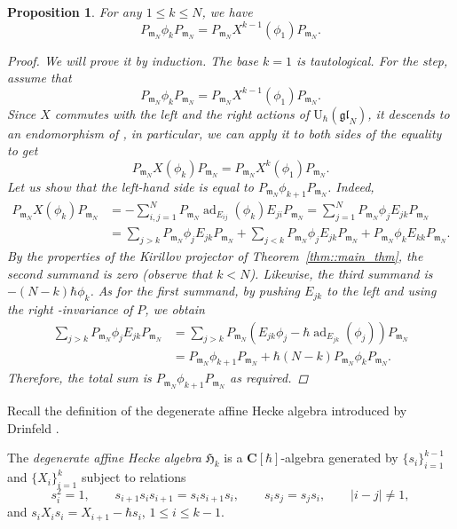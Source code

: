 \documentclass[10pt,a4paper]{article}
\numberwithin{equation}{section}
\newtheorem{Proposition}[Theorem]{Proposition}
{ \theoremstyle{definition}
	\newtheorem{Definition}[Theorem]{Definition}
	\newtheorem{Note}[Theorem]{Note}
	\newtheorem{Example}[Theorem]{Example}
	\newtheorem{Remark}[Theorem]{Remark} }
\newcommand{\C}{\mathbf{C}}
\newcommand{\U}{\mathrm{U}_{\hbar}}
\newcommand{\n}{\mathfrak{n}}
\newcommand{\m}{\mathfrak{m}}
\DeclareMathOperator{\ad}{ad}
\newcommand{\res}{\mathrm{res}}
\newcommand{\gl}{\mathfrak{gl}}
\begin{document}
	\begin{Proposition}
		\label{prop:canonical_homomorphism}
		For any $1\leq k \leq N$, we have
		\[
		P_{\m_N} \phi_k P_{\m_N} = P_{\m_N}X^{k-1} (\phi_1) P_{\m_N}.
		\]
		\begin{proof}
			We will prove it by induction. The base $k=1$ is tautological. For the step, assume that
			\[
			P_{\m_N} \phi_k P_{\m_N}= P_{\m_N} X^{k-1} (\phi_1) P_{\m_N}.
			\]
			Since $X$ commutes with the left and the right actions of $\U(\gl_N)$, it descends to an endomorphism of \smash{$\res^{\psi}_{\gl_N}(V \otimes \U(\gl_N))$}, in particular, we can apply it to both sides of the equality to get
			\[
			P_{\m_N} X(\phi_k) P_{\m_N} = P_{\m_N}X^k(\phi_1) P_{\m_N}.
			\]
			Let us show that the left-hand side is equal to $P_{\m_N}\phi_{k+1} P_{\m_N}$. Indeed,
			\begin{align*}
				P_{\m_N}X(\phi_k) P_{\m_N} &= -\sum_{i,j=1}^N P_{\m_N} \ad_{E_{ij}}(\phi_k) E_{ji} P_{\m_N} = \sum_{j=1}^N P_{\m_N} \phi_j E_{jk} P_{\m_N} \\
				&=\sum_{j>k} P_{\m_N} \phi_j E_{jk} P_{\m_N} + \sum_{j <k} P_{\m_N} \phi_j E_{jk} P_{\m_N} + P_{\m_N} \phi_k E_{kk} P_{\m_N}.
			\end{align*}
			By the properties of the Kirillov projector of Theorem~\ref{thm::main_thm}, the second summand is zero (observe that $k<N$). Likewise, the third summand is $-(N-k)\hbar \phi_k$. As for the first summand, by pushing $E_{jk}$ to the left and using the right \smash{$\n_-^{\psi}$}-invariance of $P$, we obtain
			\begin{align*}
			\sum_{j>k} P_{\m_N} \phi_j E_{jk} P_{\m_N} &= \sum_{j>k} P_{\m_N} (E_{jk}\phi_j - \hbar \ad_{E_{jk}}(\phi_j)) P_{\m_N}\\
& = P_{\m_N}\phi_{k+1} P_{\m_N} + \hbar (N-k) P_{\m_N}\phi_k P_{\m_N}.
			\end{align*}
			Therefore, the total sum is $P_{\m_N}\phi_{k+1}P_{\m_N}$ as required.
		\end{proof}
	\end{Proposition}
	
	Recall the definition of the degenerate affine Hecke algebra introduced by Drinfeld \cite{DrinfeldDaH}.
	
	\begin{Definition}
		The \emph{degenerate affine Hecke algebra} $\mathfrak{H}_k$ is a $\C[\hbar]$-algebra generated by $\{s_i\}_{i=1}^{k-1}$ and $\{X_i\}_{i=1}^k$ subject to relations
		\[
		s_i^2 = 1, \qquad s_{i+1} s_i s_{i+1} = s_i s_{i+1} s_i, \qquad s_i s_j = s_j s_i,\qquad |i-j| \neq 1,
		\]
		and
$
		s_i X_i s_i = X_{i+1} - \hbar s_i$, $ 1 \leq i \leq k-1$.
	\end{Definition}
	
\end{document}

